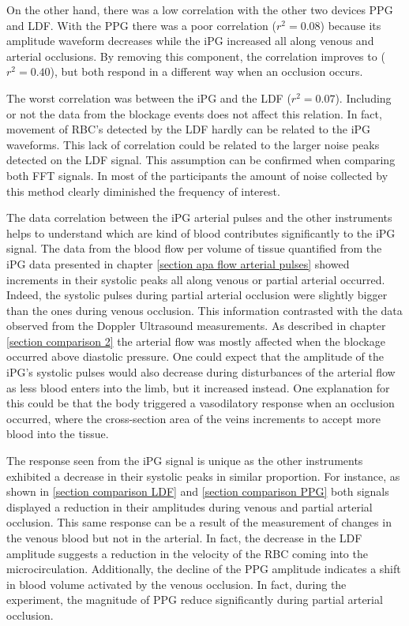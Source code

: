 On the other hand, there was a low correlation with the other two devices PPG and LDF. With the PPG there was a poor correlation ($r^2 = 0.08$) because its amplitude waveform decreases while the iPG increased all along venous and arterial occlusions.  By removing this component, the correlation improves to ($r^2 = 0.40$), but both respond in a different way when an occlusion occurs.

The worst correlation was between the iPG and the LDF ($r^2 = 0.07$). Including or not the data from the blockage events does not affect this relation. In fact, movement of RBC's detected by the LDF hardly can be related to the iPG waveforms. This lack of correlation could be related to the larger noise peaks detected on the LDF signal. This assumption can be confirmed when comparing both FFT signals. In most of the participants the amount of noise collected by this method clearly diminished the frequency of interest. 

The data correlation between the iPG arterial pulses and the other instruments helps to understand which are kind of blood contributes significantly to the iPG signal. The data from the blood flow per volume of tissue quantified from the iPG data presented in chapter \ref{section apa flow arterial pulses} showed increments in their systolic peaks all along venous or partial arterial occurred. Indeed, the systolic pulses during partial arterial occlusion were slightly bigger than the ones during venous occlusion. This information contrasted with the data observed from the Doppler Ultrasound measurements. As described in chapter \ref{section comparison 2} the arterial flow was mostly affected when the blockage occurred above diastolic pressure. One could expect that the amplitude of the iPG's systolic pulses would also decrease during disturbances of the arterial flow as less blood enters into the limb, but it increased instead. One explanation for this could be that the body triggered a vasodilatory response when an occlusion occurred, where the cross-section area of the veins increments to accept more blood into the tissue. 

The response seen from the iPG signal is unique as the other instruments exhibited a decrease in their systolic peaks in similar proportion. For instance, as shown in \ref{section comparison LDF} and \ref{section comparison PPG} both signals displayed a reduction in their amplitudes during venous and partial arterial occlusion. This same response can be a result of the measurement of changes in the venous blood but not in the arterial. In fact, the decrease in the LDF amplitude suggests a reduction in the velocity of the RBC coming into the microcirculation. Additionally, the decline of the PPG amplitude indicates a shift in blood volume activated by the venous occlusion. In fact, during the experiment, the magnitude of PPG reduce significantly during partial arterial occlusion.

